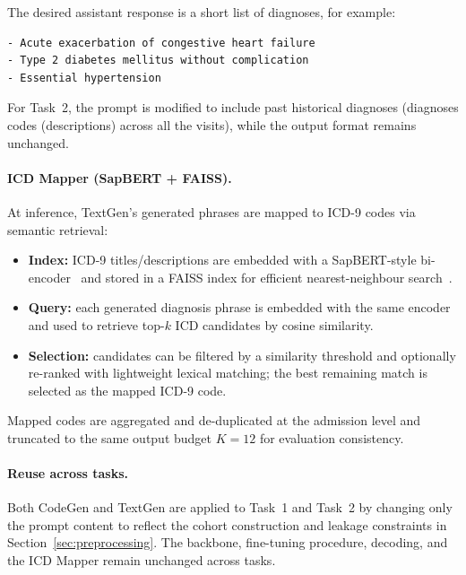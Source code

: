 The desired assistant response is a short list of diagnoses, for example:
\begin{verbatim}
- Acute exacerbation of congestive heart failure
- Type 2 diabetes mellitus without complication
- Essential hypertension
\end{verbatim}

For Task~2, the prompt is modified to include past historical diagnoses (diagnoses codes (descriptions) across all the visits), while the output format remains unchanged.

\paragraph{ICD Mapper (SapBERT + FAISS).}
At inference, TextGen’s generated phrases are mapped to ICD-9 codes via semantic retrieval:
\begin{itemize}
    \item \textbf{Index:} ICD-9 titles/descriptions are embedded with a SapBERT-style bi-encoder~\cite{liu2020self} and stored in a FAISS index for efficient nearest-neighbour search~\cite{johnson2019billion}.
    \item \textbf{Query:} each generated diagnosis phrase is embedded with the same encoder and used to retrieve top-$k$ ICD candidates by cosine similarity.
    \item \textbf{Selection:} candidates can be filtered by a similarity threshold and optionally re-ranked with lightweight lexical matching; the best remaining match is selected as the mapped ICD-9 code.
\end{itemize}
Mapped codes are aggregated and de-duplicated at the admission level and truncated to the same output budget $K=12$ for evaluation consistency.

\paragraph{Reuse across tasks.}
Both CodeGen and TextGen are applied to Task~1 and Task~2 by changing only the prompt content to reflect the cohort construction and leakage constraints in Section~\ref{sec:preprocessing}. The backbone, fine-tuning procedure, decoding, and the ICD Mapper remain unchanged across tasks.


